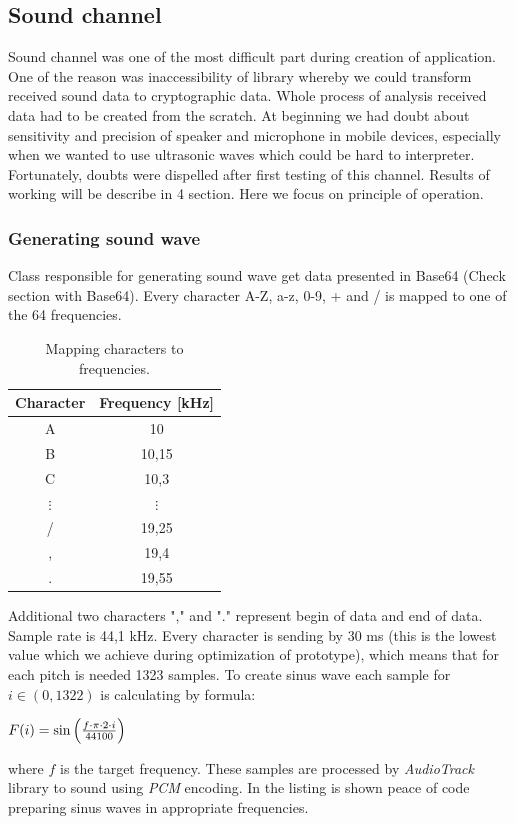 \documentclass[11pt,titlepage]{article}
\theoremstyle{plain}
\begin{document}
\subsection{Sound channel}

Sound channel was one of the most difficult part during creation of application. One of the reason was inaccessibility of library whereby we could transform received sound data to cryptographic data. Whole process of analysis received data had to be created from the scratch. At beginning we had doubt about sensitivity and precision of speaker and microphone in mobile devices, especially when we wanted to use ultrasonic waves which could be hard to interpreter. Fortunately, doubts were dispelled after first testing of this channel. Results of working will be describe in 4 section. Here we focus on principle of operation.

\subsubsection{Generating sound wave}

Class responsible for generating sound wave get data presented in Base64 (Check section with Base64). Every character A-Z, a-z, 0-9, + and / is mapped to one of the 64 frequencies.
\begin{table}
	\centering
	\begin{tabular}{| c | c |}
		\hline
		Character & Frequency [kHz] \\
		\hline
		A & 10 \\
		\hline
		B & 10,15 \\
		\hline
		C & 10,3 \\
		\hline
		$\vdots$ & $\vdots$ \\
		\hline
		/ & 19,25 \\
		\hline
		, & 19,4 \\
		\hline
		. & 19,55 \\
		\hline
	\end{tabular}
	\caption{Mapping characters to frequencies.}
\end{table}



Additional two characters "," and "." represent begin of data and end of data. Sample rate is 44,1 kHz. Every character is sending by 30 ms (this is the lowest value which we achieve during optimization of prototype), which means that for each pitch is needed 1323 samples. To create sinus wave each sample for $ i \in (0,1322) $ is calculating by formula:
\begin{center}
$F(i) = \sin\left( f \cdot \pi \cdot 2 \cdot i  \over 44 100  \right)$
\end{center}
where $f$ is the target frequency.
These samples are processed by \textit{AudioTrack} library to sound using \textit{PCM} encoding. In the listing is shown peace of code preparing sinus waves in appropriate frequencies.
\end{document}

